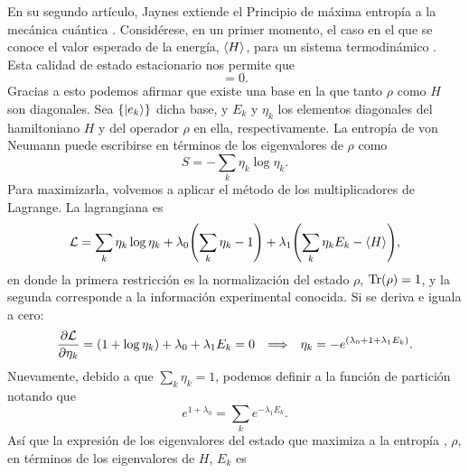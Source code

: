 En su segundo artículo, Jaynes extiende el Principio de máxima entropía a la mecánica cuántica \cite{JaynesII}. Considérese, en un primer momento, el caso en el que se conoce el valor esperado de la energía, $\expval{H}$, para un sistema termodinámico . Esta calidad de estado estacionario nos permite  que
\begin{equation*}
    [\rho,H]=0.
\end{equation*}
Gracias a esto podemos afirmar que existe una base en la que tanto $\rho$ como $H$ son diagonales. Sea $\{\ket{e_{k}}\}$ dicha base, y $E_{k}$ y $\eta_{k}$ los  elementos diagonales del hamiltoniano $H$ y del operador $\rho$ en ella, respectivamente. La entropía de von Neumann puede escribirse en términos de los eigenvalores de $\rho$ como
\begin{equation*}
    S=-\sum_{k}\eta_{k}\log{\eta_{k}}.
\end{equation*}
Para maximizarla, volvemos a aplicar el método de los multiplicadores de Lagrange. La lagrangiana es
\begin{equation*}
    \mathcal{L}=\sum_{k}\eta_{k}\log{\eta_{k}}+\lambda_{0}\qty(\sum_{k}\eta_{k}-1)+\lambda_{1}\qty(\sum_{k}\eta_{k}E_{k}-\expval{H}),
\end{equation*}
en donde la primera restricción es la normalización del estado $\rho$, $\Tr(\rho)=1$, y la segunda corresponde a la información experimental conocida. Si se deriva e iguala a cero:
\begin{align*}
    \frac{\partial \mathcal{L}}{\partial \eta_{k}}=(1+\log{\eta_{k}})+\lambda_{0}+\lambda_{1}E_{k}=0 & & \Longrightarrow  & &\eta_{k}=-e^{(\lambda_{0}+1+\lambda_{1}E_{k})}.
\end{align*}
Nuevamente, debido a que $\sum_{k}\eta_{k}=1$, podemos definir a la función de partición notando que
\begin{equation*}
    e^{1+\lambda_{0}}=\sum_{k}e^{-\lambda_{1}E_{k}}.
\end{equation*}
Así que la expresión de los eigenvalores del estado que maximiza a la entropía , $\rho$, en términos de los eigenvalores de $H$, $E_{k}$ es
